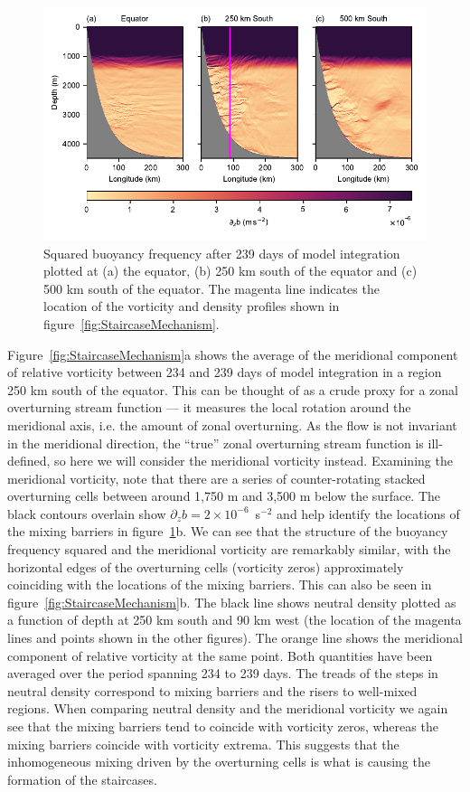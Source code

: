 \begin{figure}[h]
    \centering
    \includegraphics{../figures/Figure2.pdf}
    \caption{Squared buoyancy frequency after 239 days of model integration plotted at (a) the equator,  (b) 250 km south of the equator and (c) 500 km south of the equator. The magenta line indicates the location of the vorticity and density profiles shown in figure~\ref{fig:StaircaseMechanism}.}
    \label{fig:staircase}
\end{figure}

Figure~\ref{fig:StaircaseMechanism}a shows the average of the meridional component of relative vorticity between 234 and 239  days of model integration in a region 250 km south of the equator. This can be thought of as a crude proxy for a zonal overturning stream function --- it measures the local rotation around the meridional axis, i.e. the amount of zonal overturning. As the flow is not invariant in the meridional direction, the ``true'' zonal overturning stream function is ill-defined, so here we will consider the meridional vorticity instead. Examining the meridional vorticity, note that there are a series of counter-rotating stacked overturning cells between around 1,750 m and 3,500 m below the surface. The black contours overlain show $\partial_z b = 2 \times 10^{-6}$~s$^{-2}$ and help identify the locations of the mixing barriers in figure~\ref{fig:staircase}b. We can see that the structure of the buoyancy frequency squared and the meridional vorticity are remarkably similar, with the horizontal edges of the overturning cells (vorticity zeros) approximately coinciding with the locations of the mixing barriers. This can also be seen in figure~\ref{fig:StaircaseMechanism}b. The black line shows neutral density plotted as a function of depth at 250 km south and 90 km west (the location of the magenta lines and points shown in the other figures). The orange line shows the meridional component of relative vorticity at the same point. Both quantities have been averaged over the period spanning 234 to 239 days. The treads of the steps in neutral density correspond to mixing barriers and the risers to well-mixed regions. When comparing neutral density and the meridional vorticity we again see that the mixing barriers tend to coincide with vorticity zeros, whereas the mixing barriers coincide with vorticity extrema. This suggests that the inhomogeneous mixing driven by the overturning cells is what is causing the formation of the staircases.

